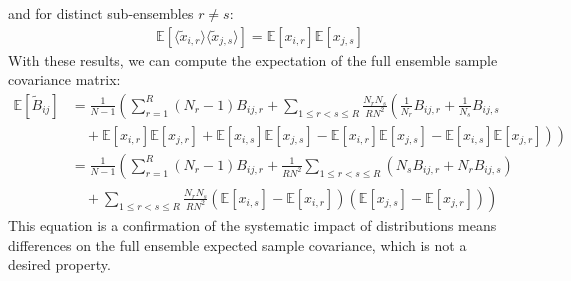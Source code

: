 \documentclass[12pt]{scrartcl}
\begin{document}
and for distinct sub-ensembles $r \ne s$:
\begin{align}
\mathbb{E} \left[\langle \widetilde{x}_{i,r} \rangle \langle \widetilde{x}_{j,s} \rangle\right] = \mathbb{E} \left[x_{i,r}\right] \mathbb{E} \left[x_{j,s}\right]
\end{align}
With these results, we can compute the expectation of the full ensemble sample covariance matrix:
\begin{align}
\mathbb{E} \left[\widetilde{B}_{ij}\right] & = \frac{1}{N-1} \left(\sum_{r=1}^R \left(N_r-1\right) B_{ij,r} + \sum_{1 \le r < s \le R} \frac{N_r N_s}{R N^2} \left(\frac{1}{N_r} B_{ij,r} + \frac{1}{N_s} B_{ij,s} \right. \right.\nonumber \\
& \left. \left. \quad + \mathbb{E} \left[x_{i,r} \right] \mathbb{E} \left[x_{j,r} \right] + \mathbb{E} \left[x_{i,s} \right] \mathbb{E} \left[x_{j,s} \right] - \mathbb{E} \left[x_{i,r}\right] \mathbb{E} \left[x_{j,s}\right] - \mathbb{E} \left[x_{i,s}\right] \mathbb{E} \left[x_{j,r}\right] \right) \right) \nonumber \\
& = \frac{1}{N-1} \left(\sum_{r=1}^R \left(N_r-1\right) B_{ij,r} + \frac{1}{R N^2} \sum_{1 \le r < s \le R} \left(N_s B_{ij,r} + N_r B_{ij,s}\right) \right. \nonumber \\
& \left. \quad + \sum_{1 \le r < s \le R} \frac{N_r N_s}{R N^2} \left(\mathbb{E} \left[x_{i,s} \right] - \mathbb{E} \left[x_{i,r} \right]\right)\left(\mathbb{E} \left[x_{j,s} \right] - \mathbb{E} \left[x_{j,r} \right] \right)\right)
\end{align}
This equation is a confirmation of the systematic impact of distributions means differences on the full ensemble expected sample covariance, which is not a desired property.
\end{document}
